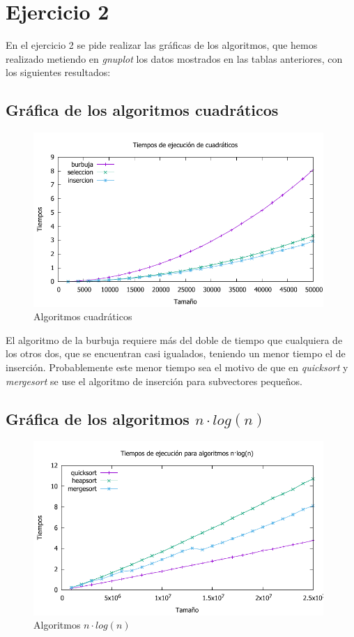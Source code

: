 \documentclass[a4paper, 11pt]{article}
\begin{document}
\newpage
\section{Ejercicio 2}

En el ejercicio 2 se pide realizar las gráficas de los algoritmos, que hemos
realizado metiendo en \textit{gnuplot} los datos mostrados en las tablas anteriores,
con los siguientes resultados:

\subsection{Gráfica de los algoritmos cuadráticos}
\begin{figure}[h] \includegraphics[width=11cm]{comparativa_cuadraticos_g} \centering
	\caption{Algoritmos cuadráticos} \end{figure}

El algoritmo de la burbuja requiere más del doble de tiempo que cualquiera de los otros dos, que se encuentran casi igualados, teniendo un menor tiempo el de inserción. Probablemente este menor tiempo sea el motivo de que en \textit{quicksort} y \textit{mergesort} se use el algoritmo de inserción para subvectores pequeños.

\subsection{Gráfica de los algoritmos $n\cdot log(n)$ }
\begin{figure}[h] \includegraphics[width=11cm]{comparativa_logaritmicos_g} \centering
	\caption{Algoritmos  $n\cdot log(n)$} \end{figure}
\end{document}
